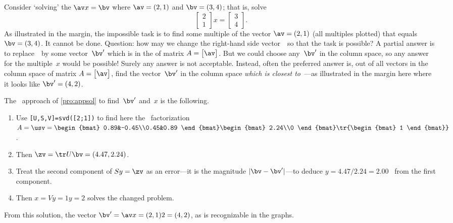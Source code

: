 \begin{example} \label{eg:incon1}
Consider `solving' the  \(\av x=\bv\) where \(\av=(2,1)\) and \(\bv=(3,4)\); that is, solve
\begin{equation*}
\begin{bmatrix} 2\\1 \end{bmatrix}x=\begin{bmatrix} 3\\4 \end{bmatrix}.
\end{equation*}
%
As illustrated in the margin, the impossible task is to find some multiple of the vector \(\av=(2,1)\) (all multiples plotted) that equals \(\bv=(3,4)\).
It cannot be done.
Question: how may we change the right-hand side vector~\bv\ so that the task is possible?  
A partial answer is to replace~\bv\ by some vector~\(\bv'\) which is in the  of matrix \(A=\begin{bmatrix} \av \end{bmatrix}\).
But we could choose any~\(\bv'\) in the column space, so any answer for the multiple~\(x\) would be possible! Surely any answer is not acceptable.
%
Instead, often the preferred answer is, out of all vectors in the column space of matrix \(A=\begin{bmatrix} \av \end{bmatrix}\),  find the vector~\(\bv'\) in the column space \emph{which is closest to}~\bv---as illustrated in the margin here where it looks like \(\bv'=(4,2)\).

The \svd\ approach of \autoref{pro:appsol} to find~\(\bv'\) and~\(x\) is the following.
\begin{enumerate}
\item Use \verb|[U,S,V]=svd([2;1])| to find here the \svd\ factorization \(A=\usv=\begin{bmat} 0.89&-0.45\\0.45&0.89 \end{bmat} \begin{bmat} 2.24\\0 \end{bmat}\tr{\begin{bmat} 1 \end{bmat}}\) \twodp.
\item Then \(\zv=\tr U\bv=(4.47,2.24)\).
\item Treat the second component of \(Sy=\zv\) as an error---it is the magnitude \(|\bv-\bv'|\)---to deduce \(y=4.47/2.24=2.00\) \twodp\ from the first component.
\item Then  \(x=Vy=1y=2\) solves the changed problem.
\end{enumerate}
From this solution, the vector \(\bv'=\av x=(2,1)2=(4,2)\), as is recognizable in the graphs.
\end{example}

